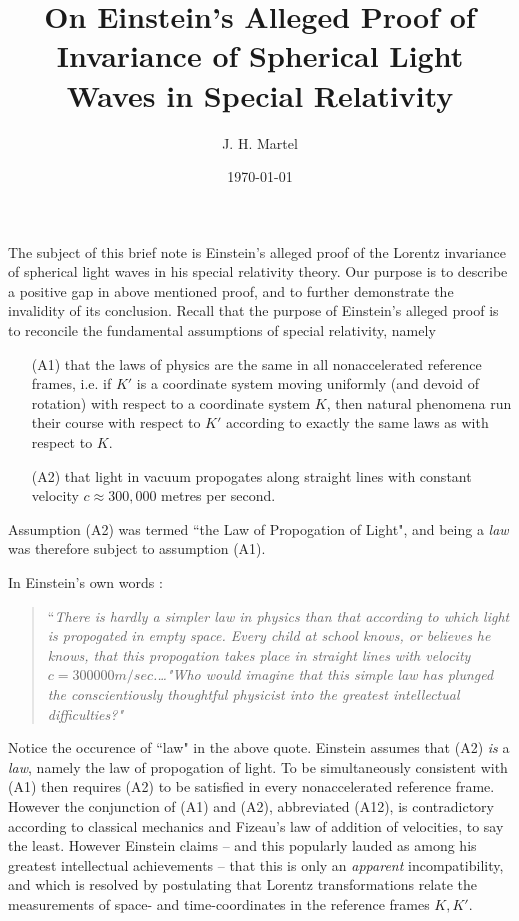 \documentclass[12pt]{amsart}
\theoremstyle{definition}
\theoremstyle{remark}
\begin{document}
\title{On Einstein's Alleged Proof of Invariance of Spherical Light Waves in Special Relativity}
\author{J. H. Martel}
\date{\today}

\maketitle

The subject of this brief note is Einstein's alleged proof of the Lorentz invariance of spherical light waves in his special relativity theory. Our purpose is to describe a positive gap in above mentioned proof, and to further demonstrate the invalidity of its conclusion. Recall that the purpose of Einstein's alleged proof is to reconcile the fundamental assumptions of special relativity, namely
\begin{itemize}

\item[(A1)] that the laws of physics are the same in all nonaccelerated reference frames, i.e. if $K'$ is a coordinate system moving uniformly (and devoid of rotation) with respect to a coordinate system $K$, then natural phenomena run their course with respect to $K'$ according to exactly the same laws as with respect to $K$. 

\item[(A2)] that light in vacuum propogates along straight lines with constant velocity $c\approx 300,000$ metres per second.

\end{itemize}

Assumption (A2) was termed ``the Law of Propogation of Light", and being a \emph{law} was therefore subject to assumption (A1). 

In Einstein's own words \cite[Ch.7, 11]{einstein2019relativity}:

\begin{quote} ``\emph{There is hardly a simpler law in physics than that according to which light is propogated in empty space. Every child at school knows, or believes he knows, that this propogation takes place in straight lines with velocity $c=300 000 m/sec$.\ldots"Who would imagine that this simple law has plunged the conscientiously thoughtful physicist into the greatest intellectual difficulties?"} \end{quote}

Notice the occurence of ``law" in the above quote. Einstein assumes that (A2) \emph{is} a \emph{law}, namely the law of propogation of light. To be simultaneously consistent with (A1) then requires (A2) to be satisfied in every nonaccelerated reference frame. However the conjunction of (A1) and (A2), abbreviated (A12), is contradictory according to classical mechanics and Fizeau's law of addition of velocities, to say the least. However Einstein claims -- and this popularly lauded as among his greatest intellectual achievements -- that this is only an \emph{apparent} incompatibility, and which is resolved by postulating that Lorentz transformations relate the measurements of space- and time-coordinates in the reference frames $K, K'$. 
\end{document}
